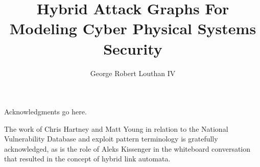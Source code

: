 \documentclass[12pt,letterpaper]{report}
\newif\iftestbox
\begin{document}
\iftestbox \testboxex \fi

%
%
\title{Hybrid Attack Graphs For Modeling Cyber Physical Systems Security}
\author{George Robert Louthan IV}

%
%
\coadvisorfalse  %

%
%


\numofpages{\pageref{LastPage}}                    %

%
%
\thesistrue  %

%
%

\copyrightfalse
\figurespagetrue   %
\tablespagetrue    %


\beforeabstract    %
\abstractp         %


%
%



\acknowledgementsp
%
%
Acknowledgments go here.

The work of Chris Hartney and Matt Young in relation to the National Vulnerability
Database and exploit pattern terminology is gratefully acknowledged, as is the
role of Aleks Kissenger in the whiteboard conversation that resulted in the concept
of hybrid link automata.
\end{document}
